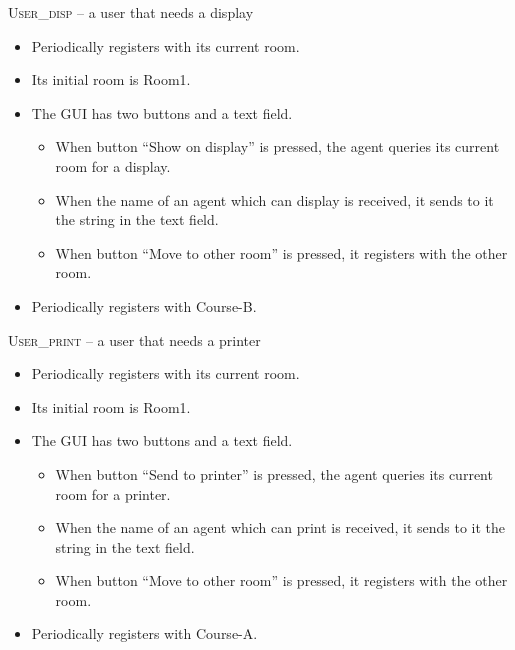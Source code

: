 \documentclass[a4paper, 12pt, twoside]{article}
\begin{document}
\textsc{User\_disp} -- a user that needs a display
\begin{itemize}
	\item Periodically registers with its current room.
	\item Its initial room is Room1.
	\item The GUI has two buttons and a text field.
	\begin{itemize}
		\item When button ``Show on display'' is pressed, the agent queries its current room for a display.
		\item When the name of an agent which can display is received, it sends to it the string in the text field.
		\item When button ``Move to other room'' is pressed, it registers with the other room. 
	\end{itemize}
	\item Periodically registers with Course-B.
\end{itemize}


\textsc{User\_print} -- a user that needs a printer
\begin{itemize}
	\item Periodically registers with its current room.
	\item Its initial room is Room1.
	\item The GUI has two buttons and a text field.
	\begin{itemize}
		\item When button ``Send to printer'' is pressed, the agent queries its current room for a printer.
		\item When the name of an agent which can print is received, it sends to it the string in the text field.
		\item When button ``Move to other room'' is pressed, it registers with the other room. 
	\end{itemize}
	\item Periodically registers with Course-A.
\end{itemize}
\end{document}
